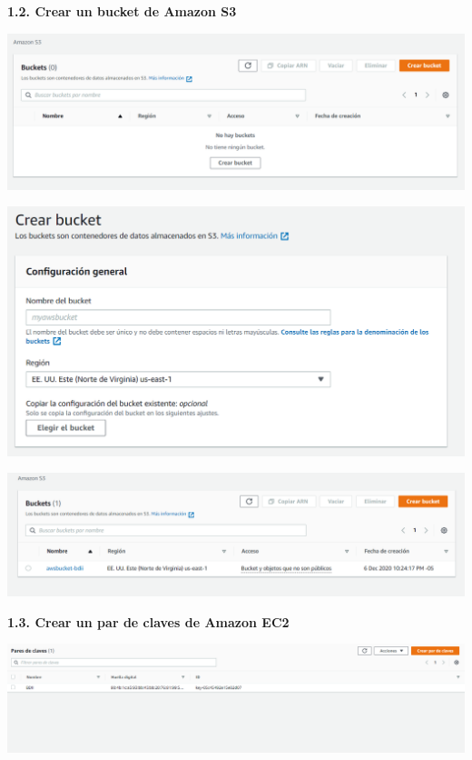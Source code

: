 \documentclass{article}
\begin{document}
\textbf{1.2. Crear un bucket de Amazon S3}

    \begin{center}
		\includegraphics[width=15cm]{./images/2} 
	\end{center}
	\begin{center}
		\includegraphics[width=15cm]{./images/3} 
	\end{center}
	\begin{center}
		\includegraphics[width=15cm]{./images/4} 
	\end{center}
\newpage
\textbf{1.3. Crear un par de claves de Amazon EC2 
}

    \begin{center}
		\includegraphics[width=15cm]{./images/5} 
	\end{center}
\end{document}
